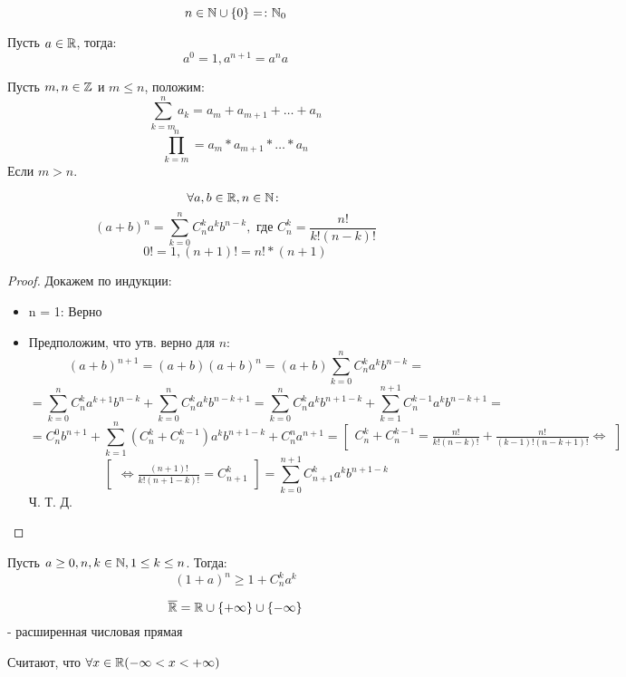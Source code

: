 \begin{symb}
\[
n \in \mathbb{N} \cup \{0\} =\colon \mathbb{N}_0
\] 
\end{symb}
\begin{definition}
Пусть $a \in \mathbb{R}$, тогда:
\[
a^{0} = 1, a^{n + 1} = a^{n} a
\] 
\end{definition}
\begin{symb}
Пусть $m, n \in \mathbb{Z}$ и $m \leq n$, положим:
\[
\sum_{k = m}^{n} a_k = a_m + a_{m + 1} + \ldots + a_n
\] 
\[
\prod_{k = m}^{n} = a_m * a_{m + 1} * \ldots * a_n
\] 
Если $m > n$.
\end{symb}
\begin{theorem}
\[
\forall a, b \in \mathbb{R}, n \in \mathbb{N} \colon 
\] 
\[
    (a + b)^{n} = \sum_{k = 0}^{n} C_{n}^{k} a^{k} b^{n - k}, \text{ где } C_{n}^{k} = \frac{n!}{k!(n - k)!}
\] 
\[
0! = 1, (n + 1)! = n! * (n + 1)
\] 
\end{theorem}
\begin{proof}
Докажем по индукции:
\begin{itemize}
    \item n = 1:  Верно
    \item Предположим, что утв. верно для $n$:
        \[
            (a + b)^{n + 1} = (a + b)(a + b)^{n} = (a + b)\sum_{k = 0}^{n} C_{n}^{k} a^{k}b^{n - k} = 
        \] 
        \[
        = \sum_{k = 0}^{n} C_{n}^{k}a^{k + 1}b^{n - k} + \sum_{k = 0}^{n} C_{n}^{k} a^{k}b^{n - k + 1} = \sum_{k = 0}^{n}  C_{n}^{k}a^{k}b^{n + 1 - k} + \sum_{k = 1}^{n + 1} C_{n}^{k - 1}a^{k}b^{n - k + 1} = 
        \] 
        \[
        = C_{n}^{0} b^{n + 1} + \sum_{k = 1}^{n} (C_{n}^{k} + C_{n}^{k - 1})a^{k}b^{n + 1 - k} + C_{n}^{n} a^{n + 1} = \begin{bmatrix}C_{n}^{k} + C_{n}^{k - 1} = \frac{n!}{k!(n - k)!} + \frac{n!}{(k - 1)!(n - k + 1)!} \iff \end{bmatrix}  
        \] 
        \[
        \begin{bmatrix} \iff \frac{(n + 1)!}{k!(n + 1 - k)!} = C_{n + 1}^{k} \end{bmatrix} = \sum_{k = 0}^{n + 1} C_{n + 1}^{k} a^{k}b^{n + 1 - k}
        \] 
        Ч. Т. Д.
\end{itemize}
\end{proof}
\begin{consequence}
Пусть $a \geq 0, n, k \in \mathbb{N}, 1 \leq k \leq n$. Тогда:
\[
    (1 + a)^{n} \geq 1 + C_{n}^{k}a^{k}
\] 
\end{consequence}
\begin{symb}
\[
\overline{\mathbb{R}} = \mathbb{R} \cup \{+\infty\} \cup \{-\infty\}
\] 
- расширенная числовая прямая

\end{symb}
Считают, что $\forall x \in \mathbb{R} (-\infty < x < +\infty)$

